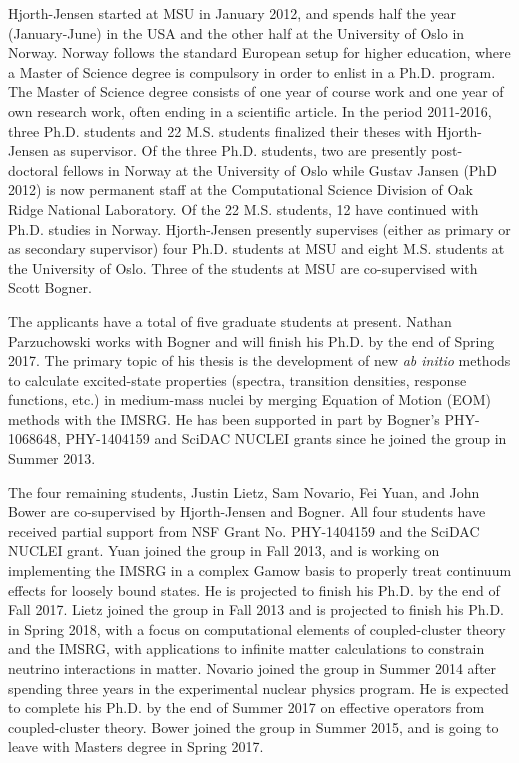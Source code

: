 Hjorth-Jensen started at MSU in January 2012, and spends half the year
(January-June) in the USA and the other half at the University of Oslo
in Norway. Norway follows the standard European setup for higher
education, where a Master of Science degree is compulsory in order to
enlist in a Ph.D. program.  The Master of Science degree consists of
one year of course work and one year of own research work, often
ending in a scientific article.  In the period 2011-2016, three
Ph.D. students and 22 M.S. students finalized their theses with
Hjorth-Jensen as supervisor. Of the three Ph.D. students, two are
presently post-doctoral fellows in Norway at the University of Oslo
while Gustav Jansen (PhD 2012) is now permanent staff at the
Computational Science Division of Oak Ridge National Laboratory. Of
the 22 M.S. students, 12 have continued with Ph.D.  studies in
Norway. Hjorth-Jensen presently supervises (either as primary or as
secondary supervisor) four Ph.D. students at MSU and eight
M.S. students at the University of Oslo. Three of the students at MSU
are co-supervised with Scott Bogner.


The applicants have a total of five graduate students at present. Nathan
Parzuchowski works with Bogner and will finish his Ph.D. by the end of
Spring 2017.  The primary topic of his thesis is the development of
new \emph{ab initio} methods to calculate excited-state properties
(spectra, transition densities, response functions, etc.)  in
medium-mass nuclei by merging Equation of Motion (EOM) methods with
the IMSRG.  He has been supported in part by Bogner's PHY-1068648,
PHY-1404159 and SciDAC NUCLEI grants since he joined the group in
Summer 2013.

The four remaining students, Justin Lietz, Sam Novario, Fei Yuan, and
John Bower are co-supervised by Hjorth-Jensen and Bogner.  All four
students have received partial support from NSF Grant No. PHY-1404159
and the SciDAC NUCLEI grant. Yuan joined the group in Fall 2013, and
is working on implementing the IMSRG in a complex Gamow basis to
properly treat continuum effects for loosely bound states. He is
projected to finish his Ph.D. by the end of Fall 2017. Lietz joined
the group in Fall 2013 and is projected to finish his Ph.D. in Spring
2018, with a focus on computational elements of coupled-cluster theory
and the IMSRG, with applications to infinite matter calculations to
constrain neutrino interactions in matter. Novario joined the group in
Summer 2014 after spending three years in the experimental nuclear
physics program.  He is expected to complete his Ph.D. by the end of
Summer 2017 on effective operators from coupled-cluster
theory. Bower joined the group in Summer 2015, and is going to leave
with Masters degree in Spring 2017.






